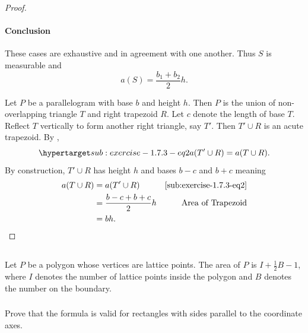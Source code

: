 \documentclass{report}
\begin{document}
\begin{proof}
    \paragraph{Conclusion}%

      These cases are exhaustive and in agreement with one another.
      Thus $S$ is measurable and $$a(S) = \frac{b_1 + b_2}{2}h.$$

    \suitdivider

    Let $P$ be a parallelogram with base $b$ and height $h$.
    Then $P$ is the union of non-overlapping triangle $T$ and right trapezoid
      $R$.
    Let $c$ denote the length of base $T$.
    Reflect $T$ vertically to form another right triangle, say $T'$.
    Then $T' \cup R$ is an acute trapezoid.
    By ,
      \begin{equation}
        \hyperlabel{sub:exercise-1.7.3-eq2}
        a(T' \cup R) = a(T \cup R).
      \end{equation}
    By construction, $T' \cup R$ has height $h$ and bases $b - c$ and $b + c$
      meaning
      \begin{align*}
        a(T \cup R)
          & = a(T' \cup R) & \eqref{sub:exercise-1.7.3-eq2} \\
          & = \frac{b - c + b + c}{2}h & \text{Area of Trapezoid} \\
          & = bh.
      \end{align*}

  \end{proof}

\subsection{}%

  Let $P$ be a polygon whose vertices are lattice points.
  The area of $P$ is $I + \frac{1}{2}B - 1$, where $I$ denotes the number of
    lattice points inside the polygon and $B$ denotes the number on the
    boundary.

\subsubsection{}%

  Prove that the formula is valid for rectangles with sides parallel to the
    coordinate axes.
\end{document}
